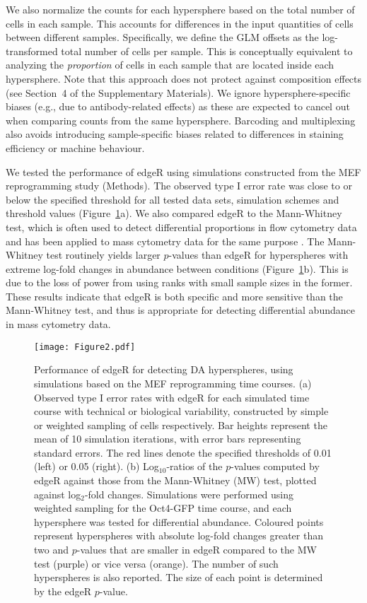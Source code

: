 \documentclass{article}
\newcommand{\suppcomponorm}{4}
\begin{document}
We also normalize the counts for each hypersphere based on the total number of cells in each sample.
This accounts for differences in the input quantities of cells between different samples.
Specifically, we define the GLM offsets as the log-transformed total number of cells per sample.
This is conceptually equivalent to analyzing the \textit{proportion} of cells in each sample that are located inside each hypersphere.
Note that this approach does not protect against composition effects (see Section~\suppcomponorm{} of the Supplementary Materials).
We ignore hypersphere-specific biases (e.g., due to antibody-related effects) as these are expected to cancel out when comparing counts from the same hypersphere.
Barcoding and multiplexing also avoids introducing sample-specific biases related to differences in staining efficiency or machine behaviour.

We tested the performance of edgeR using simulations constructed from the MEF reprogramming study (Methods).
The observed type I error rate was close to or below the specified threshold for all tested data sets, simulation schemes and threshold values (Figure~\ref{fig:testtest}a).
We also compared edgeR to the Mann-Whitney test, which is often used to detect differential proportions in flow cytometry data \cite{watson1992significance} and has been applied to mass cytometry data for the same purpose \cite{behbehani2015mass}.
The Mann-Whitney test routinely yields larger $p$-values than edgeR for hyperspheres with extreme log-fold changes in abundance between conditions (Figure~\ref{fig:testtest}b).
This is due to the loss of power from using ranks with small sample sizes in the former.
These results indicate that edgeR is both specific and more sensitive than the Mann-Whitney test, and thus is appropriate for detecting differential abundance in mass cytometry data.

\begin{figure}[bt]
    \begin{center}
        \texttt{[image: Figure2.pdf]}
    \end{center}
\caption{
Performance of edgeR for detecting DA hyperspheres, using simulations based on the MEF reprogramming time courses.
(a) Observed type I error rates with edgeR for each simulated time course with technical or biological variability, constructed by simple or weighted sampling of cells respectively.
Bar heights represent the mean of 10 simulation iterations, with error bars representing standard errors.
The red lines denote the specified thresholds of 0.01 (left) or 0.05 (right).
(b) Log$_{10}$-ratios of the $p$-values computed by edgeR against those from the Mann-Whitney (MW) test, plotted against log$_{2}$-fold changes.
Simulations were performed using weighted sampling for the Oct4-GFP time course, and each hypersphere was tested for differential abundance.
Coloured points represent hyperspheres with absolute log-fold changes greater than two and $p$-values that are smaller in edgeR compared to the MW test (purple) or vice versa (orange).
The number of such hyperspheres is also reported.
The size of each point is determined by the edgeR $p$-value.
}
\label{fig:testtest}
\end{figure}
\end{document}
